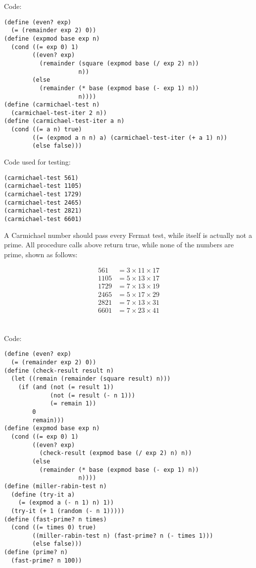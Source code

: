 \documentclass[../main.tex]{subfiles}
\begin{document}
Code:

\begin{lstlisting}
(define (even? exp)
  (= (remainder exp 2) 0))
(define (expmod base exp n)
  (cond ((= exp 0) 1)
        ((even? exp)
          (remainder (square (expmod base (/ exp 2) n)) 
                     n))
        (else
          (remainder (* base (expmod base (- exp 1) n))
                     n))))
(define (carmichael-test n)
  (carmichael-test-iter 2 n))
(define (carmichael-test-iter a n)
  (cond ((= a n) true)
        ((= (expmod a n n) a) (carmichael-test-iter (+ a 1) n))
        (else false)))
\end{lstlisting}

Code used for testing:

\begin{lstlisting}
(carmichael-test 561)
(carmichael-test 1105)
(carmichael-test 1729)
(carmichael-test 2465)
(carmichael-test 2821)
(carmichael-test 6601)
\end{lstlisting}

A Carmichael number should pass every Fermat test, while
 itself is actually not a prime. All procedure calls above
 return true, while none of the numbers are prime, shown
 as follows:

\begin{align*}
561 &= 3 \times 11 \times 17 \\
1105 &= 5 \times 13 \times 17 \\
1729 &= 7 \times 13 \times 19 \\
2465 &= 5 \times 17 \times 29 \\
2821 &= 7 \times 13 \times 31 \\
6601 &= 7 \times 23 \times 41
\end{align*}


\section{}

Code:

\begin{lstlisting}
(define (even? exp)
  (= (remainder exp 2) 0))
(define (check-result result n)
  (let ((remain (remainder (square result) n)))
    (if (and (not (= result 1))
             (not (= result (- n 1)))
             (= remain 1))
        0
        remain)))
(define (expmod base exp n)
  (cond ((= exp 0) 1)
        ((even? exp)
          (check-result (expmod base (/ exp 2) n) n))
        (else
          (remainder (* base (expmod base (- exp 1) n))
                     n))))
(define (miller-rabin-test n)
  (define (try-it a)
    (= (expmod a (- n 1) n) 1))
  (try-it (+ 1 (random (- n 1)))))
(define (fast-prime? n times)
  (cond ((= times 0) true)
        ((miller-rabin-test n) (fast-prime? n (- times 1)))
        (else false)))
(define (prime? n)
  (fast-prime? n 100))
\end{lstlisting}
\end{document}
